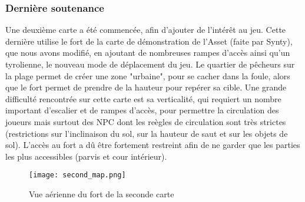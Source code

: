 \subsubsection{Dernière soutenance}

    Une deuxième carte a été commencée, afin d'ajouter de l'intérêt au jeu. Cette dernière utilise le fort de la carte 
    de démonstration de l'Asset (faite par Synty), que nous avons modifié, en ajoutant de nombreuses rampes d'accès ainsi qu'un tyrolienne, 
    le nouveau mode de déplacement du jeu. Le quartier de pêcheurs sur la plage permet de créer une zone "urbaine", pour se 
    cacher dans la foule, alors que le fort permet de prendre de la hauteur pour repérer sa cible. Une grande difficulté rencontrée sur 
    cette carte est sa verticalité, qui requiert un nombre important d'escalier et de rampes d'accès, pour permettre la 
    circulation des joueurs mais surtout des NPC dont les reègles de circulation sont très strictes (restrictions sur l'inclinaison 
    du sol, sur la hauteur de saut et sur les objets de sol). L'accès au fort a dû être fortement restreint afin de ne garder 
    que les parties les plus accessibles (parvis et cour intérieur).

    \begin{figure}[hbt!]
        \centering
        \texttt{[image: second\_map.png]}
        \caption{Vue aérienne du fort de la seconde carte}
    \end{figure}
    \FloatBarrier




